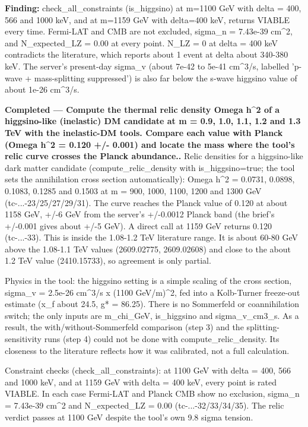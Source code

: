\documentclass[11pt,a4paper]{article}
\begin{document}
\textbf{Finding:} check\_all\_constraints (is\_higgsino) at m=1100 GeV with delta = 400, 566 and 1000 keV, and at m=1159 GeV with delta=400 keV, returns VIABLE every time. Fermi-LAT and CMB are not excluded, sigma\_n = 7.43e-39 cm\textasciicircum{}2, and N\_expected\_LZ = 0.00 at every point. N\_LZ = 0 at delta = 400 keV contradicts the literature, which reports about 1 event at delta about 340-380 keV. The server's present-day sigma\_v (about 7e-42 to 5e-41 cm\textasciicircum{}3/s, labelled 'p-wave + mass-splitting suppressed') is also far below the s-wave higgsino value of about 1e-26 cm\textasciicircum{}3/s.

\textbf{Completed --- Compute the thermal relic density Omega h\textasciicircum{}2 of a higgsino-like (inelastic) DM candidate at m = 0.9, 1.0, 1.1, 1.2 and 1.3 TeV with the inelastic-DM tools. Compare each value with Planck (Omega h\textasciicircum{}2 = 0.120 +/- 0.001) and locate the mass where the tool's relic curve crosses the Planck abundance..} Relic densities for a higgsino-like dark matter candidate (compute\_relic\_density with is\_higgsino=true; the tool sets the annihilation cross section automatically): Omega h\textasciicircum{}2 = 0.0731, 0.0898, 0.1083, 0.1285 and 0.1503 at m = 900, 1000, 1100, 1200 and 1300 GeV (tc-...-23/25/27/29/31). The curve reaches the Planck value of 0.120 at about 1158 GeV, +/-6 GeV from the server's +/-0.0012 Planck band (the brief's +/-0.001 gives about +/-5 GeV). A direct call at 1159 GeV returns 0.120 (tc-...-33). This is inside the 1.08-1.2 TeV literature range. It is about 60-80 GeV above the 1.08-1.1 TeV values (2609.02775, 2609.02608) and close to the about 1.2 TeV value (2410.15733), so agreement is only partial.

Physics in the tool: the higgsino setting is a simple scaling of the cross section, sigma\_v = 2.5e-26 cm\textasciicircum{}3/s x (1100 GeV/m)\textasciicircum{}2, fed into a Kolb-Turner freeze-out estimate (x\_f about 24.5, g* = 86.25). There is no Sommerfeld or coannihilation switch; the only inputs are m\_chi\_GeV, is\_higgsino and sigma\_v\_cm3\_s. As a result, the with/without-Sommerfeld comparison (step 3) and the splitting-sensitivity runs (step 4) could not be done with compute\_relic\_density. Its closeness to the literature reflects how it was calibrated, not a full calculation.

Constraint checks (check\_all\_constraints): at 1100 GeV with delta = 400, 566 and 1000 keV, and at 1159 GeV with delta = 400 keV, every point is rated VIABLE. In each case Fermi-LAT and Planck CMB show no exclusion, sigma\_n = 7.43e-39 cm\textasciicircum{}2 and N\_expected\_LZ = 0.00 (tc-...-32/33/34/35). The relic verdict passes at 1100 GeV despite the tool's own 9.8 sigma tension.
\end{document}
